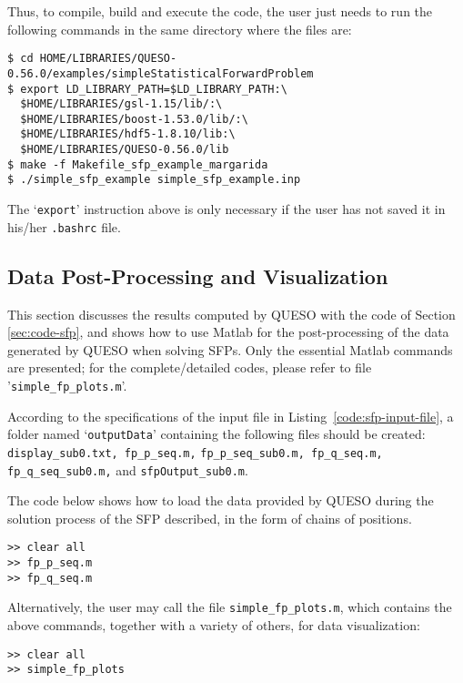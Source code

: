 Thus, to compile, build and execute the code, the user just needs to run the following commands in the same directory where the files are:
\begin{lstlisting}
$ cd HOME/LIBRARIES/QUESO-0.56.0/examples/simpleStatisticalForwardProblem 
$ export LD_LIBRARY_PATH=$LD_LIBRARY_PATH:\
  $HOME/LIBRARIES/gsl-1.15/lib/:\
  $HOME/LIBRARIES/boost-1.53.0/lib/:\
  $HOME/LIBRARIES/hdf5-1.8.10/lib:\
  $HOME/LIBRARIES/QUESO-0.56.0/lib 
$ make -f Makefile_sfp_example_margarida 
$ ./simple_sfp_example simple_sfp_example.inp
\end{lstlisting}

The `\verb+export+' instruction above is only necessary if the user has not saved it in his/her \verb+.bashrc+ file. 


\subsection{Data Post-Processing and Visualization}\label{sec:sfp-results}

This section discusses the results computed by QUESO with the code of Section \ref{sec:code-sfp}, and shows how to use Matlab for the post-processing of the data generated by QUESO when solving SFPs. Only the essential Matlab commands are presented; for the complete/detailed codes, please refer to file '\verb+simple_fp_plots.m+'.

According to the specifications of the input file in Listing~\ref{code:sfp-input-file}, a folder named `\verb+outputData+' containing the following files should be created: \verb+display_sub0.txt, fp_p_seq.m,+ \linebreak \verb+fp_p_seq_sub0.m, fp_q_seq.m, fp_q_seq_sub0.m,+ and \verb+sfpOutput_sub0.m+.

The code below shows how to load the data provided by QUESO during the solution
process of the SFP described, in the form of chains of positions.
\begin{lstlisting}[caption={Matlab code for loading the data in both parameter and QoI chains of the SFP.}]
% inside Matlab
>> clear all
>> fp_p_seq.m
>> fp_q_seq.m
\end{lstlisting}


Alternatively, the user may call the file \texttt{simple\_fp\_plots.m}, which
contains the above commands, together with a variety of others, for data
visualization:
\begin{lstlisting}[caption={Matlab code for loading the data in both parameter and QoI chains of the SFP, by calling the file \texttt{simple\_fp\_plots.m}.}]
% inside Matlab
>> clear all
>> simple_fp_plots
\end{lstlisting}




